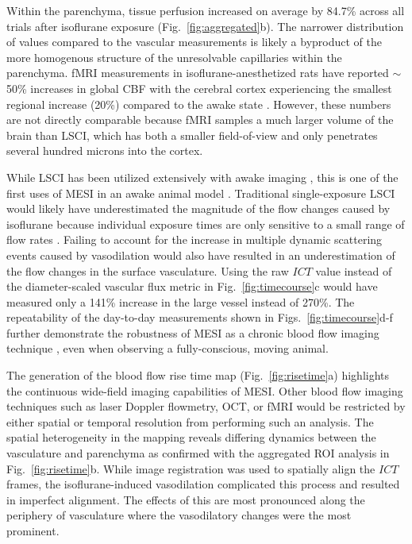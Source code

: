 \documentclass[review]{elsarticle}
\begin{document}
Within the parenchyma, tissue perfusion increased on average by 84.7\% across all trials after isoflurane exposure (Fig.~\ref{fig:aggregated}b). The narrower distribution of values compared to the vascular measurements is likely a byproduct of the more homogenous structure of the unresolvable capillaries within the parenchyma. fMRI measurements in isoflurane-anesthetized rats have reported $\sim$50\% increases in global CBF with the cerebral cortex experiencing the smallest regional increase (20\%) compared to the awake state \cite{Sicard:2003dj}. However, these numbers are not directly comparable because fMRI samples a much larger volume of the brain than LSCI, which has both a smaller field-of-view and only penetrates several hundred microns into the cortex.

While LSCI has been utilized extensively with awake imaging \cite{Takuwa:2011jr,Seto:2014ga,Lu:2017bo,Balbi:2017cj,Sunil:2020ac}, this is one of the first uses of MESI in an awake animal model \cite{He:2020}. Traditional single-exposure LSCI would likely have underestimated the magnitude of the flow changes caused by isoflurane because individual exposure times are only sensitive to a small range of flow rates \cite{Parthasarathy:2008el}. Failing to account for the increase in multiple dynamic scattering events caused by vasodilation would also have resulted in an underestimation of the flow changes in the surface vasculature. Using the raw $ICT$ value instead of the diameter-scaled vascular flux metric in Fig.~\ref{fig:timecourse}c would have measured only a 141\% increase in the large vessel instead of 270\%. The repeatability of the day-to-day measurements shown in Figs.~\ref{fig:timecourse}d-f further demonstrate the robustness of MESI as a chronic blood flow imaging technique \cite{Kazmi:2013hp}, even when observing a fully-conscious, moving animal.

The generation of the blood flow rise time map (Fig.~\ref{fig:risetime}a) highlights the continuous wide-field imaging capabilities of MESI. Other blood flow imaging techniques such as laser Doppler flowmetry, OCT, or fMRI would be restricted by either spatial or temporal resolution from performing such an analysis. The spatial heterogeneity in the mapping reveals differing dynamics between the vasculature and parenchyma as confirmed with the aggregated ROI analysis in Fig.~\ref{fig:risetime}b. While image registration was used to spatially align the $ICT$ frames, the isoflurane-induced vasodilation complicated this process and resulted in imperfect alignment. The effects of this are most pronounced along the periphery of vasculature where the vasodilatory changes were the most prominent.
\end{document}

